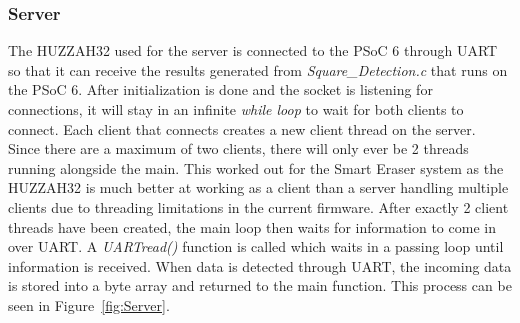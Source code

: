 \subsubsection{Server}
The HUZZAH32 used for the server is connected to the PSoC 6 through UART so that it can receive the results generated from \textit{Square\_Detection.c} that runs on the PSoC 6. After initialization is done and the socket is listening for connections, it will stay in an infinite \textit{while loop} to wait for both clients to connect. Each client that connects creates a new client thread on the server. Since there are a maximum of two clients, there will only ever be 2 threads running alongside the main. This worked out for the Smart Eraser system as the HUZZAH32 is much better at working as a client than a server handling multiple clients due to threading limitations in the current firmware. After exactly 2 client threads have been created, the main loop then waits for information to come in over UART. A \textit{UARTread()} function is called which waits in a passing loop until information is received. When data is detected through UART, the incoming data is stored into a byte array and returned to the main function. This process can be seen in Figure~\ref{fig:Server}.

